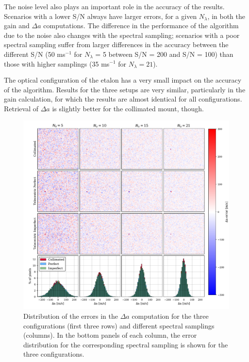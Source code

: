 The noise level also plays an important role in the accuracy of the results. Scenarios with a lower S/N always have larger errors, for a given $N_\lambda$, in both the gain and $\Delta a $ computations. The difference in the performance of the algorithm due to the noise also changes with the spectral sampling; scenarios with a poor spectral sampling suffer from larger differences in the accuracy between the different S/N (50 ms$^{-1}$ for $N_\lambda$ = 5 between S/N = 200 and S/N = 100) than those with higher samplings (35 ms$^{-1}$ for $N_\lambda = 21$).

The optical configuration of the etalon has a very small impact on the accuracy of the algorithm. Results for the three setups are very similar, particularly in the gain calculation, for which the results are almost identical for all configurations. Retrieval of $\Delta a$ is slightly better for the collimated mount, though.

\begin{figure}
    \centering
    \includegraphics[width=\textwidth]{figures/EtalonPaper/Maps_Fov_Hist.pdf}
    \caption[Error distribution along the FoV,]{Distribution of the errors in the $\Delta a$ computation for the three configurations (first three rows) and different spectral samplings (columns). In the bottom panels of each column, the error distribution for the corresponding spectral sampling is shown for the three configurations. }
   \label{fig_etalon_corr:FOV}
\end{figure}

